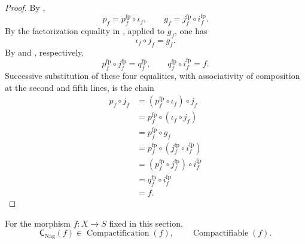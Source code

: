 \begin{proof}
  By ,
  \[
    p_f=p_f^{\mathrm{fp}}\circ\iota_f,
    \qquad
    g_f=j_f^{\mathrm{fp}}\circ i_f^{\mathrm{fp}}.
  \]
  By the factorization equality in
  , applied to $g_f$, one has
  \[
    \iota_f\circ j_f=g_f.
  \]
  By  and
  , respectively,
  \[
    p_f^{\mathrm{fp}}\circ j_f^{\mathrm{fp}}=q_f^{\mathrm{fp}},
    \qquad
    q_f^{\mathrm{fp}}\circ i_f^{\mathrm{fp}}=f.
  \]
  Successive substitution of these four equalities, with associativity of
  composition at the second and fifth lines, is the chain
  \[
  \begin{aligned}
    p_f\circ j_f
      &=(p_f^{\mathrm{fp}}\circ\iota_f)\circ j_f\\
      &=p_f^{\mathrm{fp}}\circ(\iota_f\circ j_f)\\
      &=p_f^{\mathrm{fp}}\circ g_f\\
      &=p_f^{\mathrm{fp}}\circ
        (j_f^{\mathrm{fp}}\circ i_f^{\mathrm{fp}})\\
      &=(p_f^{\mathrm{fp}}\circ j_f^{\mathrm{fp}})
        \circ i_f^{\mathrm{fp}}\\
      &=q_f^{\mathrm{fp}}\circ i_f^{\mathrm{fp}}\\
      &=f.
  \end{aligned}
  \]
\end{proof}

\begin{theorem}
  \label{thm:nagata-compactification}
  \lean{}
\checked
  For the morphism $f\colon X\to S$ fixed in this section,
  \[
    \mathsf C_{\mathrm{Nag}}(f)
      \in\operatorname{Compactification}(f),
    \qquad
    \operatorname{Compactifiable}(f).
  \]
\end{theorem}

